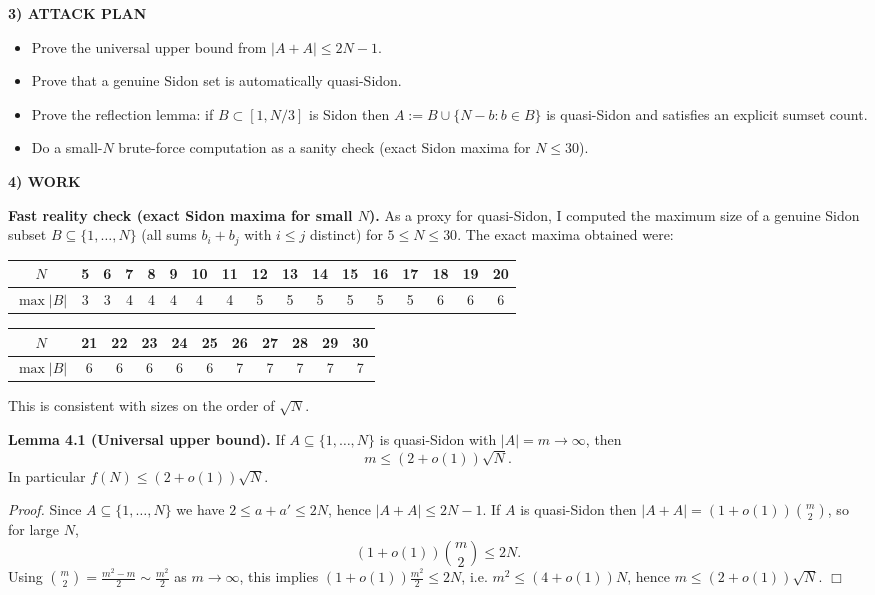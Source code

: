 \medskip
\noindent\textbf{3) ATTACK PLAN}

\begin{itemize}
\item Prove the universal upper bound from $|A+A|\le 2N-1$.
\item Prove that a genuine Sidon set is automatically quasi-Sidon.
\item Prove the reflection lemma: if $B\subset[1,N/3]$ is Sidon then $A:=B\cup\{N-b:b\in B\}$ is quasi-Sidon and satisfies an explicit sumset count.
\item Do a small-$N$ brute-force computation as a sanity check (exact Sidon maxima for $N\le 30$).
\end{itemize}

\medskip
\noindent\textbf{4) WORK}

\textbf{Fast reality check (exact Sidon maxima for small $N$).}
As a proxy for quasi-Sidon, I computed the maximum size of a genuine Sidon subset $B\subseteq\{1,\dots,N\}$ (all sums $b_i+b_j$ with $i\le j$ distinct) for $5\le N\le 30$.
The exact maxima obtained were:
\begin{center}
\begin{tabular}{c|cccccccccccccccc}
$N$ &5&6&7&8&9&10&11&12&13&14&15&16&17&18&19&20\\\hline
$\max|B|$ &3&3&4&4&4&4&4&5&5&5&5&5&5&6&6&6
\end{tabular}
\end{center}
\begin{center}
\begin{tabular}{c|cccccccccc}
$N$ &21&22&23&24&25&26&27&28&29&30\\\hline
$\max|B|$ &6&6&6&6&6&7&7&7&7&7
\end{tabular}
\end{center}
This is consistent with sizes on the order of $\sqrt N$.

\medskip
\noindent\textbf{Lemma 4.1 (Universal upper bound).}
If $A\subseteq\{1,\dots,N\}$ is quasi-Sidon with $|A|=m\to\infty$, then
\[
m\le (2+o(1))\sqrt N.
\]
In particular $f(N)\le (2+o(1))\sqrt N$.

\noindent\emph{Proof.}
Since $A\subseteq\{1,\dots,N\}$ we have $2\le a+a'\le 2N$, hence $|A+A|\le 2N-1$.
If $A$ is quasi-Sidon then $|A+A|=(1+o(1))\binom{m}{2}$, so for large $N$,
\[
(1+o(1))\binom{m}{2} \le 2N.
\]
Using $\binom{m}{2}=\frac{m^2-m}{2}\sim \frac{m^2}{2}$ as $m\to\infty$, this implies
$(1+o(1))\frac{m^2}{2}\le 2N$, i.e. $m^2\le (4+o(1))N$, hence $m\le (2+o(1))\sqrt N$.
\hfill$\Box$

